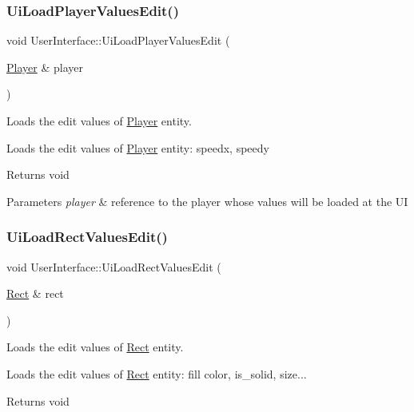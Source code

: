 \subsubsection{\texorpdfstring{Ui\+Load\+Player\+Values\+Edit()}{UiLoadPlayerValuesEdit()}}
{\footnotesize\ttfamily void User\+Interface\+::\+Ui\+Load\+Player\+Values\+Edit (\begin{DoxyParamCaption}\item[{\hyperlink{class_player}{Player} \&}]{player }\end{DoxyParamCaption})}



Loads the edit values of \hyperlink{class_player}{Player} entity. 

Loads the edit values of \hyperlink{class_player}{Player} entity\+: speedx, speedy

\begin{DoxyReturn}{Returns}
void 
\end{DoxyReturn}

\begin{DoxyParams}{Parameters}
{\em player} & reference to the player whose values will be loaded at the UI \\
\hline
\end{DoxyParams}
\mbox{\label{class_user_interface_a26d5dac3f33fb986164c6c7c8cfc5545}} 
\subsubsection{\texorpdfstring{Ui\+Load\+Rect\+Values\+Edit()}{UiLoadRectValuesEdit()}}
{\footnotesize\ttfamily void User\+Interface\+::\+Ui\+Load\+Rect\+Values\+Edit (\begin{DoxyParamCaption}\item[{\hyperlink{class_rect}{Rect} \&}]{rect }\end{DoxyParamCaption})}



Loads the edit values of \hyperlink{class_rect}{Rect} entity. 

Loads the edit values of \hyperlink{class_rect}{Rect} entity\+: fill color, is\+\_\+solid, size...

\begin{DoxyReturn}{Returns}
void 
\end{DoxyReturn}

